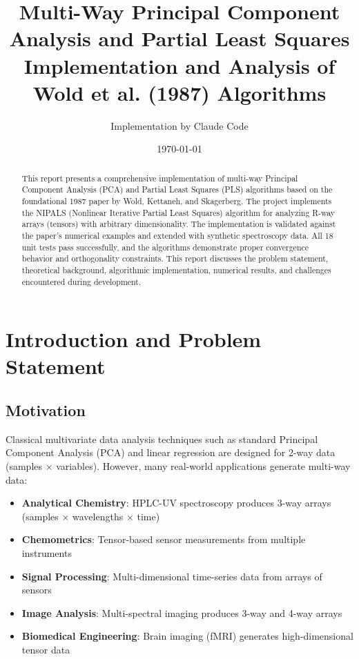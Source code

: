 \documentclass[12pt,a4paper]{article}
\title{\textbf{Multi-Way Principal Component Analysis and Partial Least Squares} \\
        \large Implementation and Analysis of Wold et al. (1987) Algorithms}
\author{Implementation by Claude Code}
\date{\today}
\begin{document}
\maketitle

\begin{abstract}
This report presents a comprehensive implementation of multi-way Principal Component Analysis (PCA) and Partial Least Squares (PLS) algorithms based on the foundational 1987 paper by Wold, Kettaneh, and Skagerberg. The project implements the NIPALS (Nonlinear Iterative Partial Least Squares) algorithm for analyzing R-way arrays (tensors) with arbitrary dimensionality. The implementation is validated against the paper's numerical examples and extended with synthetic spectroscopy data. All 18 unit tests pass successfully, and the algorithms demonstrate proper convergence behavior and orthogonality constraints. This report discusses the problem statement, theoretical background, algorithmic implementation, numerical results, and challenges encountered during development.
\end{abstract}

\newpage
\tableofcontents
\newpage

\section{Introduction and Problem Statement}

\subsection{Motivation}
Classical multivariate data analysis techniques such as standard Principal Component Analysis (PCA) and linear regression are designed for 2-way data (samples × variables). However, many real-world applications generate multi-way data:

\begin{itemize}
    \item \textbf{Analytical Chemistry}: HPLC-UV spectroscopy produces 3-way arrays (samples × wavelengths × time)
    \item \textbf{Chemometrics}: Tensor-based sensor measurements from multiple instruments
    \item \textbf{Signal Processing}: Multi-dimensional time-series data from arrays of sensors
    \item \textbf{Image Analysis}: Multi-spectral imaging produces 3-way and 4-way arrays
    \item \textbf{Biomedical Engineering}: Brain imaging (fMRI) generates high-dimensional tensor data
\end{itemize}
\end{document}
